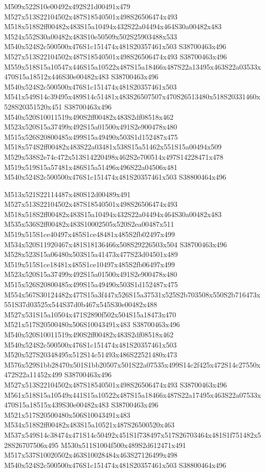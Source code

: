 \documentclass{article}
\begin{document}
\begin{multicols}{2}
M509x522S10e00492x492S21d00491x479 M527x513S22104502x487S18540501x498S26506474x493 M518x518S2ff00482x483S15a10494x432S22a04494x464S30a00482x483 M524x552S30a00482x483S10e50509x502S25903488x533 M540x524S2c500500x476S1c151474x481S20357461x503 S38700463x496 M527x513S22104502x487S18540501x498S26506474x493 S38700463x496 M559x518S15a10547x446S15a10522x487S15a18466x487S22a13495x463S22a03533x470S15a18512x446S30e00482x483 S38700463x496 M540x524S2c500500x476S1c151474x481S20357461x503 M541x549S14c39495x489S14c51481x483S26507507x470S26513480x518S20331460x528S20351520x451 S38700463x496 M540x520S10011519x490S2ff00482x483S2df08518x462 M523x520S15a37499x492S15a01500x491S2e900478x480 M515x526S20800485x499S15a49490x503S1d152487x475 M518x574S2ff00482x483S22a03481x538S15a51462x551S15a00494x509 M529x538S2e74c472x513S14220498x462S2e700514x497S14228471x478 M519x519S15a57481x486S15a51496x496S22a04506x481 M540x524S2c500500x476S1c151474x481S20357461x503 S38800464x496

M513x521S22114487x480S12d00489x491 M527x513S22104502x487S18540501x498S26506474x493 M518x518S2ff00482x483S15a10494x432S22a04494x464S30a00482x483 M535x536S2ff00482x483S10002505x520S2ea00487x511 M519x515S1ce40497x485S1ce48481x485S2fb02497x499 M534x520S11920467x481S18136466x508S29226503x504 S38700463x496 M528x523S15a06480x503S15a41473x477S23d04501x489 M519x515S1ce18481x485S1ce10497x485S2fb06497x499 M523x520S15a37499x492S15a01500x491S2e900478x480 M515x526S20800485x499S15a49490x503S1d152487x475 M554x567S30124482x477S15a3f447x526S15a37531x525S2b703508x550S2b716473x551S37d03525x544S37d0b467x545S30e00482x488 M527x531S15a10504x471S2890f502x504S15a18473x470 M521x517S20500480x506S10043491x483 S38700463x496 M540x520S10011519x490S2ff00482x483S2df08518x462 M540x524S2c500500x476S1c151474x481S20357461x503 M520x527S20348495x512S14c51493x486S22521480x473 M576x529S1bb28470x501S1bb20507x501S22a07535x499S14c2f425x472S14c27550x472S22a11452x499 S38700463x496 M527x513S22104502x487S18540501x498S26506474x493 S38700463x496 M561x518S15a10549x441S15a10522x487S15a18466x487S22a17495x463S22a07533x470S15a18515x439S30e00482x483 S38700463x496 M521x517S20500480x506S10043491x483 M534x518S2ff00482x483S15a10521x487S26500520x463 M537x549S14c38474x471S14c50492x451S1f738497x517S26703464x481S1f751482x528S26707506x495 M530x511S1004f500x489S2d612471x491 M517x537S10020502x463S10028484x463S27126499x498 M540x524S2c500500x476S1c151474x481S20357461x503 S38800464x496


\end{multicols}
\end{document}
